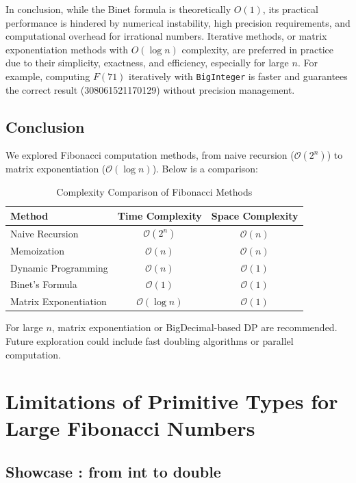 \documentclass{article}
\begin{document}
In conclusion, while the Binet formula is theoretically \(O(1)\), its practical performance is hindered by numerical instability, high precision requirements, and computational overhead for irrational numbers. Iterative methods, or matrix exponentiation methods with \(O(\log n)\) complexity, are preferred in practice due to their simplicity, exactness, and efficiency, especially for large \(n\). For example, computing \(F(71)\) iteratively with \texttt{BigInteger} is faster and guarantees the correct result (308061521170129) without precision management.


\subsection{Conclusion}
We explored Fibonacci computation methods, from naive recursion ($\mathcal{O}(2^n)$) to matrix exponentiation ($\mathcal{O}(\log n)$). Below is a comparison:

\begin{table}[h]
	\centering
	\begin{tabular}{|l|c|c|}
		\hline
		\textbf{Method} & \textbf{Time Complexity} & \textbf{Space Complexity} \\
		\hline
		Naive Recursion & $\mathcal{O}(2^n)$ & $\mathcal{O}(n)$ \\
		Memoization & $\mathcal{O}(n)$ & $\mathcal{O}(n)$ \\
		Dynamic Programming & $\mathcal{O}(n)$ & $\mathcal{O}(1)$ \\
		Binet's Formula & $\mathcal{O}(1)$ & $\mathcal{O}(1)$ \\
		Matrix Exponentiation & $\mathcal{O}(\log n)$ & $\mathcal{O}(1)$ \\
		\hline
	\end{tabular}
	\caption{Complexity Comparison of Fibonacci Methods}
\end{table}

For large $n$, matrix exponentiation or BigDecimal-based DP are recommended. Future exploration could include fast doubling algorithms or parallel computation.

\section{Limitations of Primitive Types for Large Fibonacci Numbers}
\subsection{Showcase : from int to double}

\end{document}
